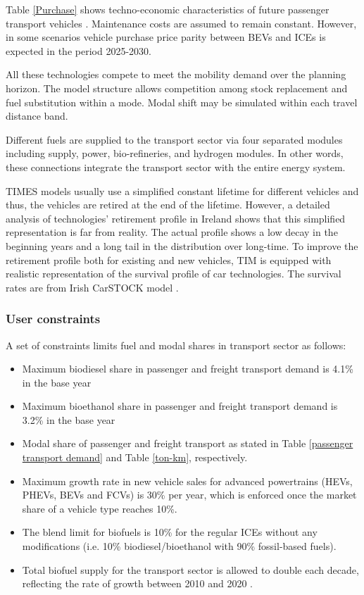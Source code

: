 \documentclass[journal abbreviation, manuscript]{copernicus}
\begin{document}
Table \ref{Purchase} shows techno-economic characteristics of future passenger transport vehicles \cite{Mulholland2017,Helgeson2020}. Maintenance costs are assumed to remain constant. However, in some scenarios vehicle purchase price parity between BEVs and ICEs is expected in the period 2025-2030. 

All these technologies compete to meet the mobility demand over the planning horizon. The model structure allows competition among stock replacement and fuel substitution within a mode. Modal shift may be simulated within each travel distance band. 

Different fuels are supplied to the transport sector via four separated modules including supply, power, bio-refineries, and hydrogen modules. In other words, these connections integrate the transport sector with the entire energy system.

TIMES models usually use a simplified constant lifetime for different vehicles and thus, the vehicles are retired at the end of the lifetime. However, a detailed analysis of technologies’ retirement profile in Ireland shows that this simplified representation is far from reality. The actual profile shows a low decay in the beginning years and a long tail in the distribution over long-time. To improve the retirement profile both for existing and new vehicles, TIM is equipped with realistic representation of the survival profile of car technologies. The survival rates are from Irish CarSTOCK model \cite{daly2011modelling, Mulholland2018}. 

\subsubsection{User constraints}

A set of constraints limits fuel and modal shares in transport sector as follows: 
\begin{itemize}
 \item Maximum biodiesel share in passenger and freight transport demand is 4.1\% in the base year
 \item Maximum bioethanol share in passenger and freight transport demand is 3.2\% in the base year
 \item Modal share of passenger and freight transport as stated in Table \ref{passenger transport demand} and Table \ref{ton-km}, respectively. 
 \item Maximum growth rate in new vehicle sales for advanced powertrains (HEVs, PHEVs, BEVs and FCVs) is 30\% per year, which is enforced once the market share of a vehicle type reaches 10\%.
 \item The blend limit for biofuels is 10\% for the regular ICEs without any modifications (i.e. 10\% biodiesel/bioethanol with 90\% fossil-based fuels). 
 \item Total biofuel supply for the transport sector is allowed to double each decade, reflecting the rate of growth between 2010 and 2020 \cite{NORA2019}. 
\end{itemize}
\end{document}
